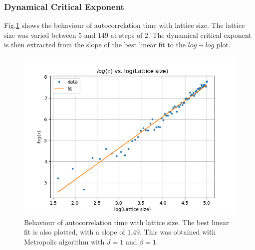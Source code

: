 \documentclass[%
reprint,
 amsmath,amssymb,
 aps,
]{revtex4-2}
\begin{document}
\subsubsection{Dynamical Critical Exponent}
Fig.\ref{fig:wormdyn} shows the behaviour of autocorrelation time with lattice size. The lattice size was varied between $5$ and $149$ at steps of $2$. The dynamical critical exponent is then extracted from the slope of the best linear fit to the $log-log$ plot.
\begin{figure}[h!]
    \centering
    \includegraphics[width=\columnwidth]{worm_dyncritexp.png}
    \caption{Behaviour of autocorrelation time with lattice size. The best linear fit is also plotted, with a slope of $1.49$. This was obtained with Metropolis algorithm with $J=1$ and $\beta=1$.}
    \label{fig:wormdyn}
\end{figure}
\end{document}
